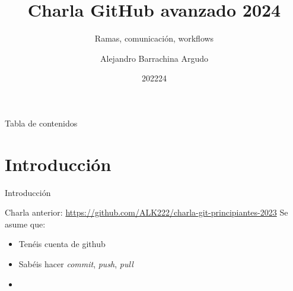 \documentclass{beamer}
\title{Charla GitHub avanzado 2024}
\subtitle{Ramas, comunicación, workflows}
\date{202224}
\author{Alejandro Barrachina Argudo}
\institute{Universidad Complutense de Madrid}
\begin{document}
\maketitle

\begin{frame}{Tabla de contenidos}
    \tableofcontents
\end{frame}

\section{Introducción}
\begin{frame}{Introducción}

    Charla anterior: \url{https://github.com/ALK222/charla-git-principiantes-2023}
    Se asume que:
    \begin{itemize}
        \item Tenéis cuenta de github
        \item Sabéis hacer \textit{commit}, \textit{push}, \textit{pull}
        \item 
    \end{itemize}
\end{frame}
\end{document}
